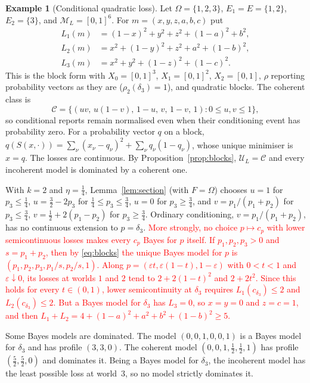 \documentclass[11pt]{article}
\theoremstyle{definition}
\newtheorem{example}[theorem]{Example}
\theoremstyle{remark}
\newcommand{\M}{\mathcal M}
\newcommand{\C}{\mathcal C}
\newcommand{\U}{\mathcal U}
\begin{document}
\begin{example}[Conditional quadratic loss]\label{ex:conditional}
Let $\Omega=\{1,2,3\}$, $E_1=E=\{1,2\}$, $E_2=\{3\}$, and $\M_L=[0,1]^6$. For $m=(x,y,z,a,b,c)$ put
\[
\begin{aligned}
 L_1(m)&=(1-x)^2+y^2+z^2+(1-a)^2+b^2,\\
 L_2(m)&=x^2+(1-y)^2+z^2+a^2+(1-b)^2,\\
 L_3(m)&=x^2+y^2+(1-z)^2+(1-c)^2.
\end{aligned}
\]
This is the block form with $X_0=[0,1]^3$, $X_1=[0,1]^2$, $X_2=[0,1]$, $\rho$ reporting probability vectors as they are ($\rho_2(\delta_3)=1$), and quadratic blocks. The coherent class is
\[
 \C=\{(uv,\,u(1-v),\,1-u,\,v,\,1-v,\,1):0\le u,v\le1\},
\]
so conditional reports remain normalised even when their conditioning event has probability zero. For a probability vector $q$ on a block, $q(S(x,\cdot))=\sum_\nu(x_\nu-q_\nu)^2+\sum_\nu q_\nu(1-q_\nu)$, whose unique minimiser is $x=q$. The losses are continuous. By Proposition~\ref{prop:blocks}, $\U_L=\C$ and every incoherent model is dominated by a coherent one.

With $k=2$ and $\eta=\tfrac14$, Lemma~\ref{lem:section} (with $F=\Omega$) chooses $u=1$ for $p_3\le\tfrac14$, $u=\tfrac32-2p_3$ for $\tfrac14\le p_3\le\tfrac34$, $u=0$ for $p_3\ge\tfrac34$, and $v=p_1/(p_1+p_2)$ for $p_3\le\tfrac34$, $v=\tfrac12+2(p_1-p_2)$ for $p_3\ge\tfrac34$. Ordinary conditioning, $v=p_1/(p_1+p_2)$, has no continuous extension to $p=\delta_3$. \textcolor{red}{More strongly, no choice $p\mapsto c_p$ with lower semicontinuous losses makes every $c_p$ Bayes for $p$ itself. If $p_1,p_2,p_3>0$ and $s=p_1+p_2$, then by \eqref{eq:blocks} the unique Bayes model for $p$ is $(p_1,p_2,p_3,p_1/s,p_2/s,1)$. Along $p=(\varepsilon t,\varepsilon(1-t),1-\varepsilon)$ with $0<t<1$ and $\varepsilon\downarrow0$, its losses at worlds $1$ and $2$ tend to $2+2(1-t)^2$ and $2+2t^2$. Since this holds for every $t\in(0,1)$, lower semicontinuity at $\delta_3$ requires $L_1(c_{\delta_3})\le2$ and $L_2(c_{\delta_3})\le2$. But a Bayes model for $\delta_3$ has $L_3=0$, so $x=y=0$ and $z=c=1$, and then $L_1+L_2=4+(1-a)^2+a^2+b^2+(1-b)^2\ge5$.}

Some Bayes models are dominated. The model $(0,0,1,0,0,1)$ is a Bayes model for $\delta_3$ and has profile $(3,3,0)$. The coherent model $(0,0,1,\tfrac12,\tfrac12,1)$ has profile $(\tfrac52,\tfrac52,0)$ and dominates it. Being a Bayes model for $\delta_3$, the incoherent model has the least possible loss at world~$3$, so no model strictly dominates it.
\end{example}
\end{document}
